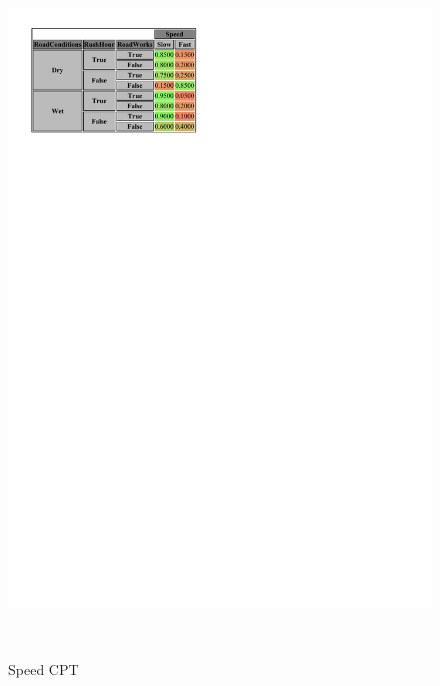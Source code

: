 \documentclass[a4paper,12pt]{article} %
\begin{document}
\begin{figure}[H]
	\centering
	\begin{minipage}[c]{.45\textwidth}
		\centering
		\includegraphics[width=\linewidth]{../code/speed.pdf}	
		\caption*{Speed CPT}
		\label{fig:speed}
	\end{minipage}
	~
	\begin{minipage}[c]{.45\textwidth}
	\centering

\end{minipage}
\end{figure}
\end{document}
